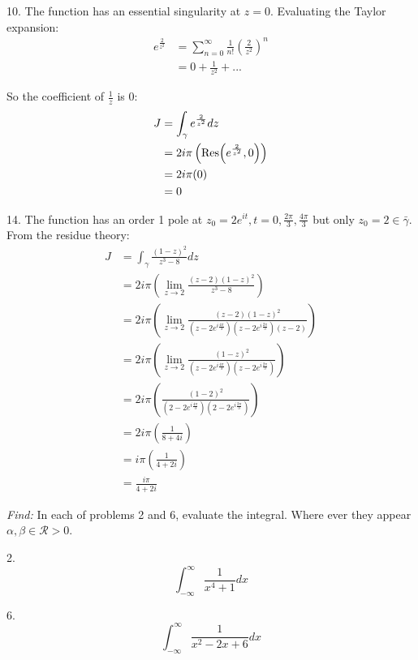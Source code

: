 \documentclass[11pt]{homework}
\begin{document}
10. The function has an essential singularity at $z=0$.
Evaluating the Taylor expansion:
\begin{align*}
e^{\frac{2}{z^2}} &= \sum_{n=0}^{\infty} \frac{1}{n!} \left(\frac{2}{z^2}\right)^n \\
 &= 0 + \frac{1}{z^2} + ...
\end{align*}

So the coefficient of $\frac{1}{z}$ is 0:
\begin{align*}
J &= \int_\gamma e^{\frac{2}{z^2}} dz \\
  &= 2 i \pi \left( \Res(e^\frac{2}{z^2}, 0) \right) \\
  &= 2 i \pi (0) \\
  &= 0
\end{align*}

14. The function has an order 1 pole at $z_0 = 2e^{it}, t = 0,\frac{2\pi}{3}, \frac{4\pi}{3}$
but only $z_0 = 2 \in \bar{\gamma}$.
From the residue theory:
\begin{align*}
J &= \int_\gamma \frac{(1-z)^2}{z^3-8} dz \\
  &= 2i\pi \left( \lim_{z\to 2} \frac{(z-2)(1-z)^2}{z^3-8} \right) \\
  &= 2i\pi \left( \lim_{z\to 2} \frac{(z-2)(1-z)^2}{(z-2e^{i\frac{4\pi}{3}})(z-2e^{i\frac{2\pi}{3}})(z-2)} \right) \\
  &= 2i\pi \left( \lim_{z\to 2} \frac{(1-z)^2}{(z-2e^{i\frac{4\pi}{3}})(z-2e^{i\frac{2\pi}{3}})} \right) \\
  &= 2i\pi \left( \frac{(1-2)^2}{(2-2e^{i\frac{4\pi}{3}})(2-2e^{i\frac{2\pi}{3}})} \right) \\
  &= 2i\pi \left( \frac{1}{8+4i} \right) \\
  &= i\pi \left( \frac{1}{4+2i} \right) \\
  &= \frac{i\pi}{4+2i}
\end{align*}

\emph{Find:}
\newline
In each of problems 2 and 6,
evaluate the integral. 
Where ever they appear $\alpha,\beta\in\mathcal{R}>0$.

2. 
\begin{equation*}
\int_{-\infty}^{\infty} \frac{1}{x^4+1} dx
\end{equation*}

6.
\begin{equation*}
\int_{-\infty}^{\infty} \frac{1}{x^2-2x+6} dx
\end{equation*}
\end{document}
